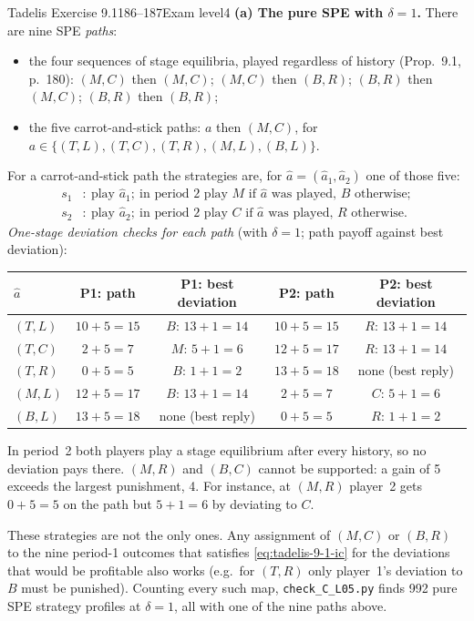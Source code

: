 \begin{exsol}{Tadelis Exercise 9.1}{186--187}{Exam level}{4}
\textbf{(a) The pure SPE with $\delta = 1$.} There are nine SPE \emph{paths}:
\begin{itemize}
  \item the four sequences of stage equilibria, played regardless of history (Prop.~9.1, p.~180):
  $(M,C)$ then $(M,C)$; $(M,C)$ then $(B,R)$; $(B,R)$ then $(M,C)$; $(B,R)$ then $(B,R)$;
  \item the five carrot-and-stick paths: $a$ then $(M,C)$, for $a \in \{(T,L), (T,C), (T,R),
  (M,L), (B,L)\}$.
\end{itemize}
For a carrot-and-stick path the strategies are, for $\hat a = (\hat a_1, \hat a_2)$ one of those five:
\begin{align*}
  s_1&:\ \text{play } \hat a_1;\ \text{in period 2 play } M \text{ if } \hat a \text{ was played, } B
  \text{ otherwise};\\
  s_2&:\ \text{play } \hat a_2;\ \text{in period 2 play } C \text{ if } \hat a \text{ was played, } R
  \text{ otherwise}.
\end{align*}
\emph{One-stage deviation checks for each path} (with $\delta = 1$; path payoff against best deviation):
\begin{center}
\small
\begin{tabular}{lcccc}
\toprule
$\hat a$ & P1: path & P1: best deviation & P2: path & P2: best deviation\\
\midrule
$(T,L)$ & $10+5=15$ & $B$: $13+1=14$ & $10+5=15$ & $R$: $13+1=14$\\
$(T,C)$ & $2+5=7$ & $M$: $5+1=6$ & $12+5=17$ & $R$: $13+1=14$\\
$(T,R)$ & $0+5=5$ & $B$: $1+1=2$ & $13+5=18$ & none (best reply)\\
$(M,L)$ & $12+5=17$ & $B$: $13+1=14$ & $2+5=7$ & $C$: $5+1=6$\\
$(B,L)$ & $13+5=18$ & none (best reply) & $0+5=5$ & $R$: $1+1=2$\\
\bottomrule
\end{tabular}
\end{center}
In period~2 both players play a stage equilibrium after every history, so no deviation pays there.
$(M,R)$ and $(B,C)$ cannot be supported: a gain of 5 exceeds the largest punishment, 4. For instance,
at $(M,R)$ player~2 gets $0 + 5 = 5$ on the path but $5 + 1 = 6$ by deviating to $C$.

These strategies are not the only ones. Any assignment of $(M,C)$ or $(B,R)$ to the nine period-1
outcomes that satisfies \eqref{eq:tadelis-9-1-ic} for the deviations that would be profitable also
works (e.g.\ for $(T,R)$ only player~1's deviation to $B$ must be punished). Counting every such map,
\texttt{check\_C\_L05.py} finds 992 pure SPE strategy profiles at $\delta = 1$, all with one of the nine
paths above.


\end{exsol}
